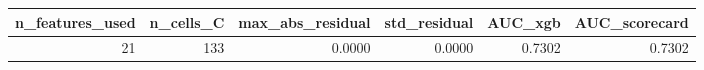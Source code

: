 \begin{tabular}{rrrrrr}
\toprule
n_features_used & n_cells_C & max_abs_residual & std_residual & AUC_xgb & AUC_scorecard \\
\midrule
21 & 133 & 0.0000 & 0.0000 & 0.7302 & 0.7302 \\
\bottomrule
\end{tabular}
